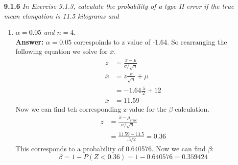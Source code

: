 \documentclass[11pt]{article}
\begin{document}
\noindent \textbf{9.1.6} \emph{In Exercise 9.1.3, calculate the probability of a type II error if the true mean elongation is 11.5 kilograms and}
\begin{enumerate}
\item \emph{$\alpha = 0.05 $ and $n = 4$.}
\\\textbf{Answer:}
$\alpha = 0.05$ correspoinds to z value of -1.64. So rearranging the following equation we solve for $\bar{x}$.
\begin{equation}
\begin{split}
z &= \frac{\bar{x} - \mu}{\sigma/\sqrt{n}} \\
\bar{x} &= z\frac{\sigma}{\sqrt{n}} + \mu\\
&= -1.64\frac{.5}{2}+12 \\
\bar{x} &=11.59
\end{split}
\end{equation}
Now we can find teh corresponding z-value for the $\beta$ calculation.
\begin{equation}
\begin{split}
z &= \frac{\bar{x} - \mu_{true}}{\sigma/\sqrt{n}} \\
&= \frac{11.59 - 11.5}{.5/2} = 0.36
\end{split}
\end{equation}
This corresponds to a probability of 0.640576. Now we can find $\beta$:
\begin{equation}
\beta = 1 - P(Z < 0.36) = 1 - 0.640576 = 0.359424
\end{equation}






\end{enumerate}
\end{document}

